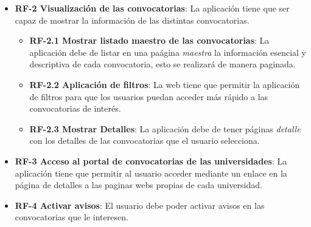 \begin{itemize}
\item\textbf{RF-2 Visualización de las convocatorias}: La aplicación tiene que ser capaz de mostrar la información de las distintas convocatorias.
\begin{itemize}
\item\textbf{RF-2.1 Mostrar listado maestro de las convocatorias}: La aplicación debe de listar en una paágina \textit{maestra} la información esencial y descriptiva de cada convocatoria, esto se realizará de manera paginada.
\item\textbf{RF-2.2 Aplicación de filtros}: La web tiene que permitir la aplicación de filtros para que los usuarios puedan acceder más rápido a las convocatorias de interés.
\item\textbf{RF-2.3 Mostrar Detalles}: La aplicación debe de tener páginas \textit{detalle} con los detalles de las convocatorias que el usuario selecciona.

\end{itemize}

\item\textbf{RF-3 Acceso al portal de convocatorias de las universidades}: La aplicación tiene que permitir al usuario acceder mediante un enlace en la página de detalles a las paginas webs propias de cada universidad.

\item\textbf{RF-4 Activar avisos}: El usuario debe poder activar avisos en las convocatorias que le interesen.


\end{itemize}
